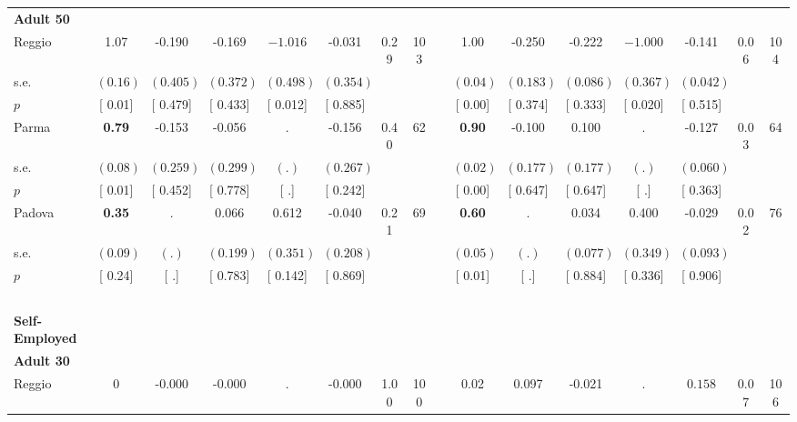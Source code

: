 \begin{longtable}{L{8em} c c c c c c c p{1em} c c c c c c c}
\quad \quad \textbf{Adult 50} & & & & & & & & & & & & & & & \\* 
\quad \quad \quad Reggio& 1.07 &    -0.190 &    -0.169 & $ \mathbf{   -1.016}$ &    -0.031 &      0.29 &       103 & & 1.00 &    -0.250 &    -0.222 & $ \mathbf{   -1.000}$ &    -0.141 &      0.06 &       104  \\*
\quad \quad \quad \quad s.e.& $ (     0.16)$ & $ (    0.405)$ & $ (    0.372)$ & $ (    0.498)$ & $ (    0.354)$ & & & & $ (     0.04)$ & $ (    0.183)$ & $ (    0.086)$ & $ (    0.367)$ & $ (    0.042)$ & &  \\*
\quad \quad \quad \quad $ p$ & [     0.01] & [    0.479] & [    0.433] & [    0.012] & [    0.885] & & & & [     0.00] & [    0.374] & [    0.333] & [    0.020] & [    0.515] & &  \\[1em]
\quad \quad \quad Parma& \textbf{     0.79} &    -0.153 &    -0.056 &         . &    -0.156 &      0.40 &        62 & & \textbf{     0.90} &    -0.100 &     0.100 &         . &    -0.127 &      0.03 &        64  \\*
\quad \quad \quad \quad s.e.& $ (     0.08)$ & $ (    0.259)$ & $ (    0.299)$ & $ (        .)$ & $ (    0.267)$ & & & & $ (     0.02)$ & $ (    0.177)$ & $ (    0.177)$ & $ (        .)$ & $ (    0.060)$ & &  \\*
\quad \quad \quad \quad $ p$ & [     0.01] & [    0.452] & [    0.778] & [        .] & [    0.242] & & & & [     0.00] & [    0.647] & [    0.647] & [        .] & [    0.363] & &  \\[1em]
\quad \quad \quad Padova& \textbf{     0.35} &         . &     0.066 &     0.612 &    -0.040 &      0.21 &        69 & & \textbf{     0.60} &         . &     0.034 &     0.400 &    -0.029 &      0.02 &        76  \\*
\quad \quad \quad \quad s.e.& $ (     0.09)$ & $ (        .)$ & $ (    0.199)$ & $ (    0.351)$ & $ (    0.208)$ & & & & $ (     0.05)$ & $ (        .)$ & $ (    0.077)$ & $ (    0.349)$ & $ (    0.093)$ & &  \\*
\quad \quad \quad \quad $ p$ & [     0.24] & [        .] & [    0.783] & [    0.142] & [    0.869] & & & & [     0.01] & [        .] & [    0.884] & [    0.336] & [    0.906] & &  \\[1em]
~\\[1em]
\textbf{Self-Employed} \\*
\quad \quad \textbf{Adult 30} & & & & & & & & & & & & & & & \\* 
\quad \quad \quad Reggio& 0 &    -0.000 &    -0.000 &         . &    -0.000 &      1.00 &       100 & & 0.02 &     0.097 &    -0.021 &         . & $ \mathbf{    0.158}$ &      0.07 &       106  \\*

\end{longtable}
